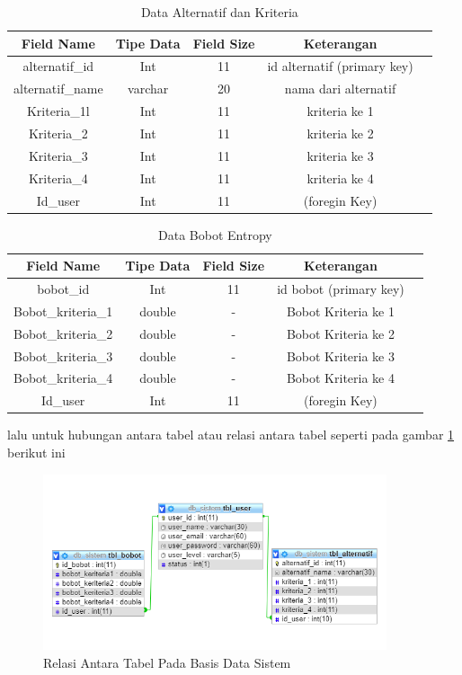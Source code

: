 \begin{table}[h]
\caption{Data Alternatif dan Kriteria}
\centering
\begin{tabular}{|c|c|c|c|c|}
\hline
 Field Name & Tipe Data & Field Size&Keterangan\\
\hline
alternatif\_id&Int&11&id alternatif (primary key)\\
\hline
alternatif\_name&varchar&20&nama dari alternatif\\
\hline
Kriteria\_1l&Int&11&kriteria ke 1\\
\hline
Kriteria\_2&Int&11&kriteria ke 2\\
\hline
Kriteria\_3&Int&11&kriteria ke 3\\
\hline
Kriteria\_4 &Int&11&kriteria ke 4\\
\hline
Id\_user &Int&11&(foregin Key)\\
\hline
\end{tabular}
\label{B42}
\end{table}

\begin{table}[h]
\caption{Data Bobot Entropy}
\centering
\begin{tabular}{|c|c|c|c|c|}
\hline
 Field Name & Tipe Data & Field Size&Keterangan\\
\hline
bobot\_id&Int&11&id bobot (primary key)\\
\hline
Bobot\_kriteria\_1&double&-&Bobot Kriteria ke 1\\
\hline
Bobot\_kriteria\_2&double&-&Bobot Kriteria ke 2\\
\hline
Bobot\_kriteria\_3&double&-&Bobot Kriteria ke 3\\
\hline
Bobot\_kriteria\_4&double&-&Bobot Kriteria ke 4\\
\hline
Id\_user &Int&11&(foregin Key)\\
\hline
\end{tabular}
\label{B41}
\end{table}

\pagebreak
lalu untuk hubungan antara tabel atau relasi antara tabel seperti pada gambar \ref{db1} berikut ini

\begin{figure}[!htbp]
	\centerline{\includegraphics[width=0.90\textwidth]{figures/db/1.png}}
	\caption{Relasi Antara Tabel Pada Basis Data Sistem}
	\label{db1}
\end{figure}

